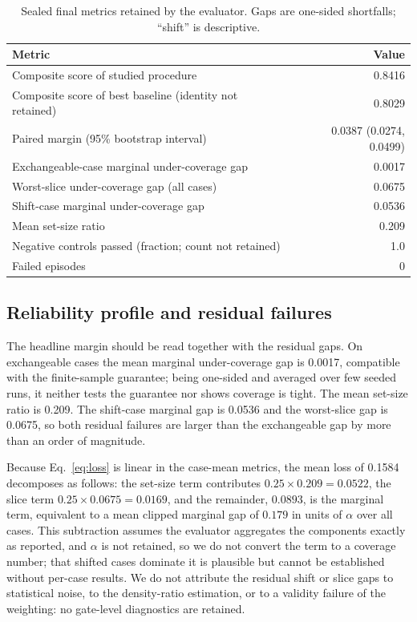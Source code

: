 \documentclass{article}
\begin{document}
\begin{table}[!tbp]
\centering
\caption{Sealed final metrics retained by the evaluator. Gaps are one-sided shortfalls; ``shift'' is descriptive.}
\label{tab:final}
\begin{tabular}{lr}
\toprule
Metric & Value \\
\midrule
Composite score of studied procedure & 0.8416 \\
Composite score of best baseline (identity not retained) & 0.8029 \\
Paired margin (95\% bootstrap interval) & 0.0387 (0.0274, 0.0499) \\
Exchangeable-case marginal under-coverage gap & 0.0017 \\
Worst-slice under-coverage gap (all cases) & 0.0675 \\
Shift-case marginal under-coverage gap & 0.0536 \\
Mean set-size ratio & 0.209 \\
Negative controls passed (fraction; count not retained) & 1.0 \\
Failed episodes & 0 \\
\bottomrule
\end{tabular}
\end{table}

\subsection{Reliability profile and residual failures}
The headline margin should be read together with the residual gaps. On exchangeable cases the mean marginal under-coverage gap is 0.0017, compatible with the finite-sample guarantee; being one-sided and averaged over few seeded runs, it neither tests the guarantee nor shows coverage is tight. The mean set-size ratio is 0.209. The shift-case marginal gap is 0.0536 and the worst-slice gap is 0.0675, so both residual failures are larger than the exchangeable gap by more than an order of magnitude. %

Because Eq.~\eqref{eq:loss} is linear in the case-mean metrics, the mean loss of 0.1584 decomposes as follows: the set-size term contributes $0.25\times0.209=0.0522$, the slice term $0.25\times0.0675=0.0169$, and the remainder, $0.0893$, is the marginal term, equivalent to a mean clipped marginal gap of $0.179$ in units of $\alpha$ over all cases. %
This subtraction assumes the evaluator aggregates the components exactly as reported, and $\alpha$ is not retained, so we do not convert the term to a coverage number; that shifted cases dominate it is plausible but cannot be established without per-case results. We do not attribute the residual shift or slice gaps to statistical noise, to the density-ratio estimation, or to a validity failure of the weighting: no gate-level diagnostics are retained.
\end{document}
